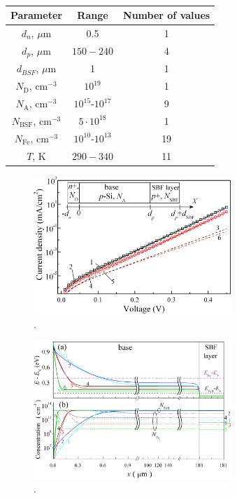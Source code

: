 \documentclass[12pt]{article}
\begin{document}
\begin{table}
\caption{\label{tabParametr}
}
\begin{tabular}{|c|c|c|}
\hline
Parameter& Range& Number of values\\
\hline
$d_n$, $\mu$m&0.5&1\\
\hline
$d_p$, $\mu$m&$150-240$&4\\
\hline
$d_{BSF}$, $\mu$m&1&1\\
\hline
$N_\mathrm{D}$, cm$^{-3}$&$10^{19}$&1\\
\hline
$N_\mathrm{A}$, cm$^{-3}$&$10^{15}$-$10^{17}$&9\\
\hline
$N_\mathrm{BSF}$, cm$^{-3}$&$5\cdot10^{18}$&1\\
\hline
$N_\mathrm{Fe}$, cm$^{-3}$&$10^{10}$-$10^{13}$&19\\
\hline
$T$, K&$290-340$&11\\
\hline
\end{tabular}
\end{table}

\begin{figure}
\includegraphics[width=7.5cm]{FigIV}
\caption{.
}
\label{FigIV}
\end{figure}


\begin{figure}
\includegraphics[width=7.5cm]{FigEfAll}
\caption{.
}
\label{FigEf}
\end{figure}
\end{document}
